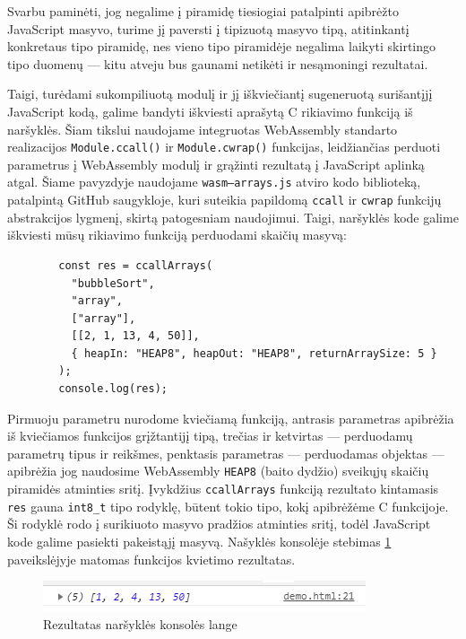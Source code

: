 \documentclass{VUMIFPSkursinis}
\begin{document}
Svarbu paminėti, jog negalime į piramidę tiesiogiai patalpinti apibrėžto JavaScript masyvo, turime jį paversti į tipizuotą masyvo tipą, atitinkantį konkretaus tipo piramidę, nes vieno tipo piramidėje negalima laikyti skirtingo tipo duomenų — kitu atveju bus gaunami netikėti ir nesąmoningi rezultatai. 

Taigi, turėdami sukompiliuotą modulį ir jį iškviečiantį sugeneruotą surišantįjį JavaScript kodą, galime bandyti iškviesti aprašytą C rikiavimo funkciją iš naršyklės. Šiam tikslui naudojame integruotas WebAssembly standarto realizacijos \verb|Module.ccall()| ir \verb|Module.cwrap()| funkcijas, leidžiančias perduoti parametrus į WebAssembly modulį ir grąžinti rezultatą į JavaScript aplinką atgal. Šiame pavyzdyje naudojame \verb|wasm—arrays.js| atviro kodo biblioteką, patalpintą GitHub saugykloje, kuri suteikia papildomą \verb|ccall| ir \verb|cwrap| funkcijų abstrakcijos lygmenį, skirtą patogesniam naudojimui. \cite{WAA19} Taigi, naršyklės kode galime iškviesti mūsų rikiavimo funkciją perduodami skaičių masyvą:

\begin{center}
\begin{small}
\begin{verbatim}
        const res = ccallArrays(
          "bubbleSort",
          "array",
          ["array"],
          [[2, 1, 13, 4, 50]],
          { heapIn: "HEAP8", heapOut: "HEAP8", returnArraySize: 5 }
        );
        console.log(res);
\end{verbatim}
\end{small}
\end{center}

Pirmuoju parametru nurodome kviečiamą funkciją, antrasis parametras apibrėžia iš kviečiamos funkcijos grįžtantijį tipą, trečias ir ketvirtas — perduodamų parametrų tipus ir reikšmes, penktasis parametras — perduodamas objektas — apibrėžia jog naudosime WebAssembly \verb|HEAP8| (baito dydžio) sveikųjų skaičių piramidės atminties sritį. Įvykdžius \verb|ccallArrays| funkciją rezultato kintamasis \verb|res| gauna \verb|int8_t| tipo rodyklę, būtent tokio tipo, kokį apibrėžėme C funkcijoje. Ši rodyklė rodo į surikiuoto masyvo pradžios atminties sritį, todėl JavaScript kode galime pasiekti pakeistąjį masyvą. Našyklės konsolėje stebimas \ref{fig:sorted_array} paveikslėjyje matomas funkcijos kvietimo rezultatas.

\begin{figure}[h!]
  \begin{center}
  \includegraphics[scale=1]{sorted_array.png}
  \end{center}
  \caption{Rezultatas naršyklės konsolės lange}
  \label{fig:sorted_array}
\end{figure}
\end{document}

